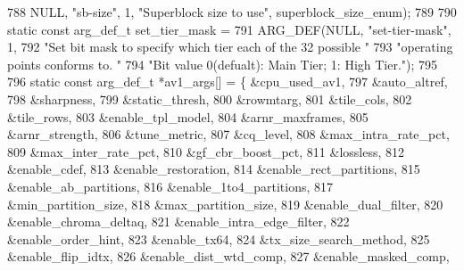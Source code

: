 \begin{DoxyCodeInclude}
{{{{{{{788     NULL, \textcolor{stringliteral}{"sb-size"}, 1, \textcolor{stringliteral}{"Superblock size to use"}, superblock\_size\_enum);
789 
790 \textcolor{keyword}{static} \textcolor{keyword}{const} arg\_def\_t set\_tier\_mask =
791     ARG\_DEF(NULL, \textcolor{stringliteral}{"set-tier-mask"}, 1,
792             \textcolor{stringliteral}{"Set bit mask to specify which tier each of the 32 possible "}
793             \textcolor{stringliteral}{"operating points conforms to. "}
794             \textcolor{stringliteral}{"Bit value 0(defualt): Main Tier; 1: High Tier."});
795 
796 \textcolor{keyword}{static} \textcolor{keyword}{const} arg\_def\_t *av1\_args[] = \{ &cpu\_used\_av1,
797                                        &auto\_altref,
798                                        &sharpness,
799                                        &static\_thresh,
800                                        &rowmtarg,
801                                        &tile\_cols,
802                                        &tile\_rows,
803                                        &enable\_tpl\_model,
804                                        &arnr\_maxframes,
805                                        &arnr\_strength,
806                                        &tune\_metric,
807                                        &cq\_level,
808                                        &max\_intra\_rate\_pct,
809                                        &max\_inter\_rate\_pct,
810                                        &gf\_cbr\_boost\_pct,
811                                        &lossless,
812                                        &enable\_cdef,
813                                        &enable\_restoration,
814                                        &enable\_rect\_partitions,
815                                        &enable\_ab\_partitions,
816                                        &enable\_1to4\_partitions,
817                                        &min\_partition\_size,
818                                        &max\_partition\_size,
819                                        &enable\_dual\_filter,
820                                        &enable\_chroma\_deltaq,
821                                        &enable\_intra\_edge\_filter,
822                                        &enable\_order\_hint,
823                                        &enable\_tx64,
824                                        &tx\_size\_search\_method,
825                                        &enable\_flip\_idtx,
826                                        &enable\_dist\_wtd\_comp,
827                                        &enable\_masked\_comp,
}}}}}}}
\end{DoxyCodeInclude}
